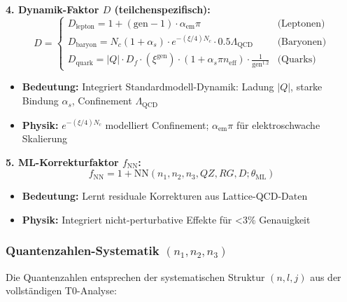 	\textbf{4. Dynamik-Faktor $D$ (teilchenspezifisch):}
	\begin{equation}
		D = 
		\begin{cases} 
			D_{\text{lepton}} = 1 + (\text{gen} - 1) \cdot \alpha_{\text{em}} \pi & \text{(Leptonen)} \\
			D_{\text{baryon}} = N_c (1 + \alpha_s) \cdot e^{-(\xi/4) N_c} \cdot 0.5 \Lambda_{\text{QCD}} & \text{(Baryonen)} \\
			D_{\text{quark}} = |Q| \cdot D_f \cdot (\xi^{\text{gen}}) \cdot (1 + \alpha_s \pi n_{\text{eff}}) \cdot \frac{1}{\text{gen}^{1.2}} & \text{(Quarks)}
		\end{cases}
	\end{equation}
	\begin{itemize}
		\item \textbf{Bedeutung:} Integriert Standardmodell-Dynamik: Ladung $|Q|$, starke Bindung $\alpha_s$, Confinement $\Lambda_{\text{QCD}}$
		\item \textbf{Physik:} $e^{-(\xi/4) N_c}$ modelliert Confinement; $\alpha_{\text{em}} \pi$ für elektroschwache Skalierung
	\end{itemize}
	
	\textbf{5. ML-Korrekturfaktor $f_{\text{NN}}$:}
	\begin{equation}
		f_{\text{NN}} = 1 + \text{NN}(n_1, n_2, n_3, QZ, RG, D; \theta_{\text{ML}})
	\end{equation}
	\begin{itemize}
		\item \textbf{Bedeutung:} Lernt residuale Korrekturen aus Lattice-QCD-Daten
		\item \textbf{Physik:} Integriert nicht-perturbative Effekte für <3\% Genauigkeit
	\end{itemize}
	
	\subsubsection{Quantenzahlen-Systematik $(n_1, n_2, n_3)$}
	
	Die Quantenzahlen entsprechen der systematischen Struktur $(n, l, j)$ aus der vollständigen T0-Analyse:
	
